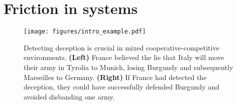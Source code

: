 \section{Friction in  systems}
\begin{figure}[ht]
    \centering
    \texttt{[image: figures/intro\_example.pdf]}
    \caption{Detecting deception is crucial in mixed cooperative-competitive environments. \textbf{(Left)} \textcolor{fra}{France} believed the lie that \textcolor{ita}{Italy} will move their army in Tyrolia to Munich, losing Burgundy and subsequently Marseilles to \textcolor{ger}{Germany}. \textbf{(Right)} If \textcolor{fra}{France} had detected the deception, they could have successfully defended Burgundy and avoided disbanding one army.}
    \label{fig:intro_example}
\end{figure}


